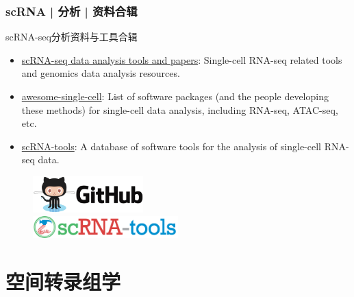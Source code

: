 \documentclass[11pt]{ctexbeamer}
\begin{document}
\begin{frame}
	\frametitle{scRNA | 分析 | 资料合辑}
	\begin{block}{scRNA-seq分析资料与工具合辑}
		\begin{itemize}
			\item \href{https://github.com/mdozmorov/scRNA-seq_notes}{scRNA-seq data analysis tools and papers}: Single-cell RNA-seq related tools and genomics data analysis resources.
			\item  \href{https://github.com/seandavi/awesome-single-cell}{awesome-single-cell}: List of software packages (and the people developing these methods) for single-cell data analysis, including RNA-seq, ATAC-seq, etc.
			\item  \href{https://github.com/scRNA-tools/scRNA-tools}{scRNA-tools}: A database of software tools for the analysis of single-cell RNA-seq data.
		\end{itemize}
		\end{block}
	\begin{figure}
		\includegraphics[width=0.38\textwidth]{github_logo_04.png}\\
		\vspace{0.5em}
		\includegraphics[width=0.5\textwidth]{scRNA_tools_logo.png}
	\end{figure}
\end{frame}


\section{空间转录组学}
\end{document}
